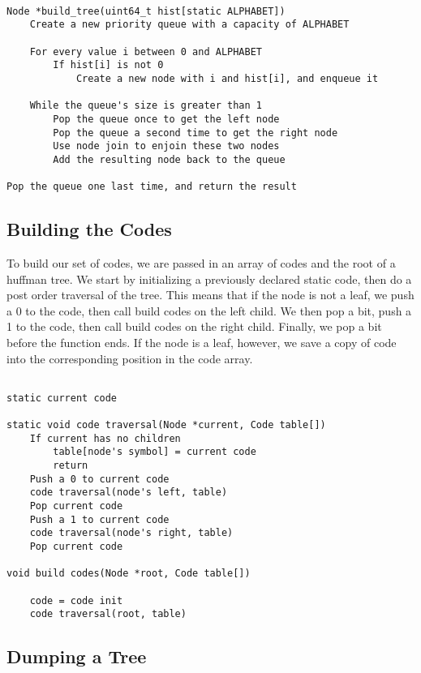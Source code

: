\documentclass[11pt]{article}
\begin{document}
\begin{verbatim}

Node *build_tree(uint64_t hist[static ALPHABET])
    Create a new priority queue with a capacity of ALPHABET

    For every value i between 0 and ALPHABET
        If hist[i] is not 0
            Create a new node with i and hist[i], and enqueue it

    While the queue's size is greater than 1
        Pop the queue once to get the left node
        Pop the queue a second time to get the right node
        Use node join to enjoin these two nodes
        Add the resulting node back to the queue

Pop the queue one last time, and return the result

\end{verbatim}

\subsection{Building the Codes}

To build our set of codes, we are passed in an array of codes and the root of a huffman tree. We start by initializing a previously declared static code, then do a post order traversal of the tree. This means that if the node is not a leaf, we push a 0 to the code, then call build codes on the left child. We then pop a bit, push a 1 to the code, then call build codes on the right child. Finally, we pop a bit before the function ends. If the node is a leaf, however, we save a copy of code into the corresponding position in the code array.

\begin{verbatim}

static current code

static void code traversal(Node *current, Code table[])
    If current has no children
        table[node's symbol] = current code
        return
    Push a 0 to current code
    code traversal(node's left, table)
    Pop current code
    Push a 1 to current code
    code traversal(node's right, table)
    Pop current code

void build codes(Node *root, Code table[])

    code = code init
    code traversal(root, table)

\end{verbatim}

\subsection{Dumping a Tree}
\end{document}
